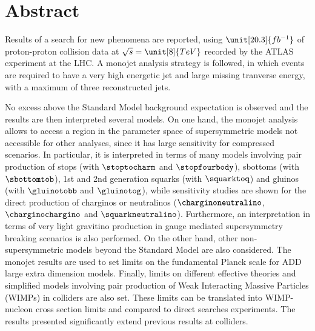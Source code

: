 \thispagestyle{empty}
\newpage
{} %
\chapter*{Abstract}

Results of a search for new phenomena are reported, using $\unit[20.3]{fb^{-1}}$ of proton-proton collision data at $\sqrt{s} = \unit[8]{TeV}$ recorded by the ATLAS experiment at the LHC.
A monojet analysis strategy is followed, in which events are required to have a very high energetic jet and large missing tranverse energy, with a maximum of three reconstructed jets.

No excess above the Standard Model background expectation is observed and the results are then interpreted several models.
On one hand, the monojet analysis allows to access a region in the parameter space of supersymmetric models not accessible for other analyses, since it has large sensitivity for compressed scenarios.
In particular, it is interpreted in terms of many models involving pair production of stops (with $\stoptocharm$ and $\stopfourbody$), sbottoms (with $\sbottomtob$), 1st and 2nd generation squarks (with $\squarktoq$) and gluinos (with $\gluinotobb$ and $\gluinotog$), while sensitivity studies are shown for the direct production of charginos or neutralinos ($\charginoneutralino$, $\charginochargino$ and $\squarkneutralino$).
Furthermore, an interpretation in terms of very light gravitino production in gauge mediated supersymmetry breaking scenarios is also performed.
On the other hand, other non-supersymmetric models beyond the Standard Model are also considered.
The monojet results are used to set limits on the fundamental Planck scale for ADD large extra dimension models.
Finally, limits on different effective theories and simplified models involving pair production of Weak Interacting Massive Particles (WIMPs) in colliders are also set.
These limits can be translated into WIMP-nucleon cross section limits and compared to direct searches experiments.
The results presented significantly extend previous results at colliders.

